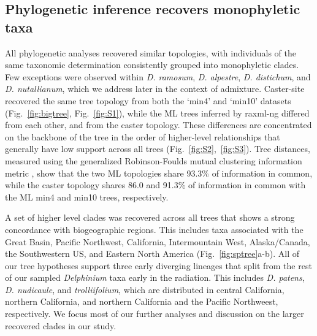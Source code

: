 \documentclass[11pt]{article}
\begin{document}
\subsection{Phylogenetic inference recovers monophyletic taxa}
All phylogenetic analyses recovered similar topologies, with individuals of the same 
taxonomic determination consistently grouped into monophyletic clades. Few exceptions
were observed within \emph{D. ramosum}, \emph{D. alpestre}, \emph{D. distichum}, and 
\emph{D. nutallianum}, which we address later in the context of admixture.
% 
Caster-site recovered the same tree topology from both the `min4' and `min10' 
datasets (Fig.~\ref{fig:bigtree}, Fig.~\ref{fig:S1}), while the ML trees
inferred by raxml-ng differed from each other, and from the caster topology.
% 
These differences are concentrated on the backbone of the tree in the order 
of higher-level relationships that generally have low support across all trees 
(Fig.~\ref{fig:S2},~\ref{fig:S3}).
% 
Tree distances, measured using the generalized Robinson-Foulds mutual clustering
information metric \citep[MCI;][]{smith_information_2020}, show that the two
ML topologies share 93.3\% of information in common, while the caster topology
shares 86.0 and 91.3\% of information in common with the ML min4 and min10 
trees, respectively.


A set of higher level clades was recovered across all trees that shows a strong
concordance with biogeographic regions.
This includes taxa associated with the Great Basin, Pacific Northwest, California, 
Intermountain West, Alaska/Canada, the Southwestern US, and Eastern North America
(Fig.~\ref{fig:sptree}a-b). 
% 
All of our tree hypotheses support three early diverging lineages that split
from the rest of our sampled \emph{Delphinium} taxa early in the radiation. 
This includes \emph{D. patens}, \emph{D. nudicaule}, and \emph{trolliifolium},
which are distributed in central California, northern California, and northern 
California and the Pacific Northweest, respectively. We focus most of our further
analyses and discussion on the larger recovered clades in our study.
% 
\end{document}
